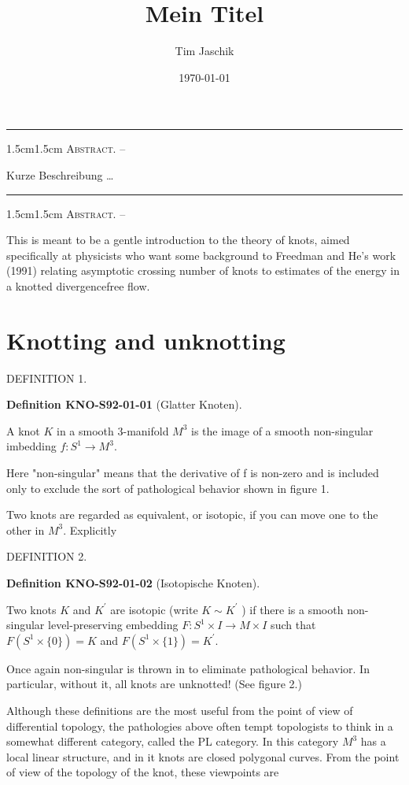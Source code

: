 \documentclass[10pt, letterpaper]{article}
\title{Mein Titel}
\author{Tim Jaschik}
\date{\today}
\renewenvironment{abstract}
  {
    \begin{adjustwidth}{1.5cm}{1.5cm}
    \small
    \textsc{Abstract. –}%
  }
  {
    \end{adjustwidth}
  }
\newcommand{\CustomHeading}[3]{%
  \par\medskip\noindent%
  \textbf{#1 #2} \textnormal{(#3)}.\enskip%
}
\newenvironment{DEF}[2]{\begin{unitbox}\CustomHeading{Definition}{#1}{#2}}{\end{unitbox}}
\begin{document}
\maketitle
\rule{\textwidth}{0.5pt}
\begin{abstract}
Kurze Beschreibung …
\end{abstract}
\rule{\textwidth}{0.5pt}
\vspace{0.5cm}

\tableofcontents

\pagebreak


\begin{abstract}
This is meant to be a gentle introduction to the theory of knots, aimed specifically at physicists who want some background to Freedman and He's work (1991) relating asymptotic crossing number of knots to estimates of the energy in a knotted divergencefree flow.
\end{abstract}


\section{Knotting and unknotting}
DEFINITION 1. 
\begin{DEF}{KNO-S92-01-01}{Glatter Knoten}
A knot $K$ in a smooth 3-manifold $M^{3}$ is the image of a smooth non-singular imbedding $f: S^{1} \rightarrow M^{3}$.
\end{DEF}

Here "non-singular" means that the derivative of f is non-zero and is included only to exclude the sort of pathological behavior shown in figure 1.

Two knots are regarded as equivalent, or isotopic, if you can move one to the other in $M^{3}$. Explicitly

DEFINITION 2. 

\begin{DEF}{KNO-S92-01-02}{Isotopische Knoten}
Two knots $K$ and $K^{\prime}$ are isotopic (write $K \sim K^{\prime}$ ) if there is a smooth non-singular level-preserving embedding $F: S^{1} \times I \rightarrow M \times I$ such that $F\left(S^{1} \times\{0\}\right)=K$ and $F\left(S^{1} \times\{1\}\right)=K^{\prime}$.
\end{DEF}

Once again non-singular is thrown in to eliminate pathological behavior. In particular, without it, all knots are unknotted! (See figure 2.)

Although these definitions are the most useful from the point of view of differential topology, the pathologies above often tempt topologists to think in a somewhat different category, called the PL category. In this category $M^{3}$ has a local linear structure, and in it knots are closed polygonal curves. From the point of view of the topology of the knot, these viewpoints are
\end{document}
